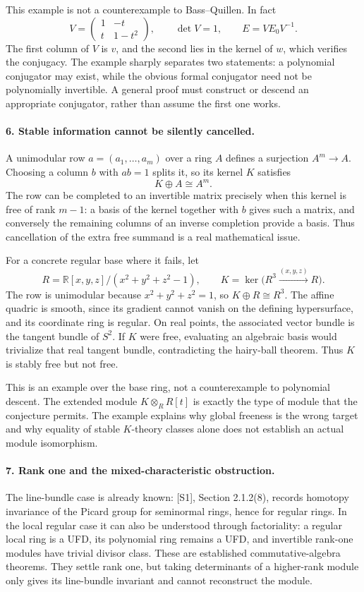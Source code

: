 \documentclass[11pt]{article}
\begin{document}
This example is not a counterexample to Bass--Quillen. In fact
\[
 V=\begin{pmatrix}1&-t\\t&1-t^2\end{pmatrix},\qquad\det V=1,
 \qquad E=VE_0V^{-1}.
\]
The first column of $V$ is $v$, and the second lies in the kernel of $w$, which verifies the conjugacy. The example sharply separates two statements: a polynomial conjugator may exist, while the obvious formal conjugator need not be polynomially invertible. A general proof must construct or descend an appropriate conjugator, rather than assume the first one works.

\paragraph{6. Stable information cannot be silently cancelled.}
A unimodular row $a=(a_1,\ldots,a_m)$ over a ring $A$ defines a surjection $A^m\to A$. Choosing a column $b$ with $ab=1$ splits it, so its kernel $K$ satisfies
\[
 K\oplus A\cong A^m.
\]
The row can be completed to an invertible matrix precisely when this kernel is free of rank $m-1$: a basis of the kernel together with $b$ gives such a matrix, and conversely the remaining columns of an inverse completion provide a basis. Thus cancellation of the extra free summand is a real mathematical issue.

For a concrete regular base where it fails, let
\[
 R=\mathbb R[x,y,z]/(x^2+y^2+z^2-1),
 \qquad K=\ker\bigl(R^3\xrightarrow{(x,y,z)}R\bigr).
\]
The row is unimodular because $x^2+y^2+z^2=1$, so $K\oplus R\cong R^3$. The affine quadric is smooth, since its gradient cannot vanish on the defining hypersurface, and its coordinate ring is regular. On real points, the associated vector bundle is the tangent bundle of $S^2$. If $K$ were free, evaluating an algebraic basis would trivialize that real tangent bundle, contradicting the hairy-ball theorem. Thus $K$ is stably free but not free.

This is an example over the base ring, not a counterexample to polynomial descent. The extended module $K\otimes_RR[t]$ is exactly the type of module that the conjecture permits. The example explains why global freeness is the wrong target and why equality of stable $K$-theory classes alone does not establish an actual module isomorphism.

\paragraph{7. Rank one and the mixed-characteristic obstruction.}
The line-bundle case is already known: [S1], Section 2.1.2(8), records homotopy invariance of the Picard group for seminormal rings, hence for regular rings. In the local regular case it can also be understood through factoriality: a regular local ring is a UFD, its polynomial ring remains a UFD, and invertible rank-one modules have trivial divisor class. These are established commutative-algebra theorems. They settle rank one, but taking determinants of a higher-rank module only gives its line-bundle invariant and cannot reconstruct the module.
\end{document}
